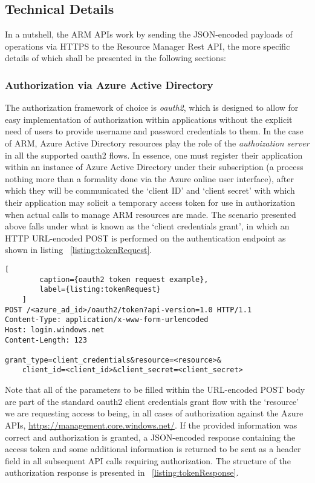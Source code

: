 \documentclass[11pt]{report}
\begin{document}
\subsection{Technical Details}

In a nutshell, the ARM APIs work by sending the JSON-encoded payloads of
operations via HTTPS to the Resource Manager Rest API, the more specific
details of which shall be presented in the following sections:

\subsubsection{Authorization via Azure Active Directory}

The authorization framework of choice is \textit{oauth2}, which is designed to
allow for easy implementation of authorization within applications without the
explicit need of users to provide username and password credentials to them. In
the case of ARM, Azure Active Directory resources play the role of the
\textit{authoization server} in all the supported oauth2 flows. \newline
In essence, one must register their application within an instance of Azure
Active Directory under their subscription (a process nothing more than a
formality done via the Azure online user interface), after which they will be
communicated the `client ID' and `client secret' with which their application
may solicit a temporary access token for use in authorization when actual calls
to manage ARM resources are made. The scenario presented above falls under what
is known as the `client credentials grant', in which an HTTP URL-encoded POST
is performed on the authentication endpoint as shown in listing
~\ref{listing:tokenRequest}.

\begin{lstlisting}[
        caption={oauth2 token request example},
        label={listing:tokenRequest}
    ]
POST /<azure_ad_id>/oauth2/token?api-version=1.0 HTTP/1.1
Content-Type: application/x-www-form-urlencoded
Host: login.windows.net
Content-Length: 123

grant_type=client_credentials&resource=<resource>&
    client_id=<client_id>&client_secret=<client_secret>
\end{lstlisting}

Note that all of the parameters to be filled within the URL-encoded POST body
are part of the standard oauth2 client credentials grant flow with the
`resource' we are requesting access to being, in all cases of authorization
against the Azure APIs, \url{https://management.core.windows.net/}.
If the provided information was correct and authorization is granted,
a JSON-encoded response containing the access token and some
additional information is returned to be sent as a header field in all
subsequent API calls requiring authorization. The structure of the
authorization response is presented in ~\ref{listing:tokenResponse}.
\end{document}
